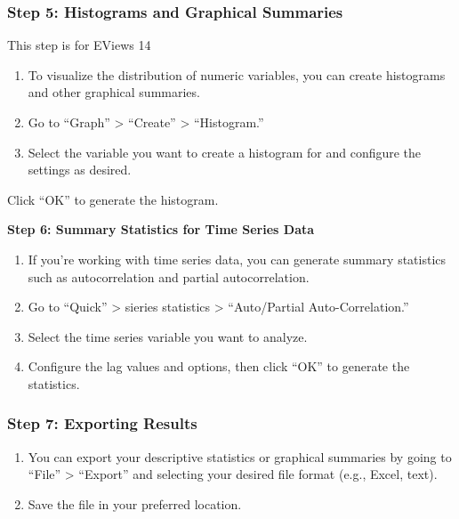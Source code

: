 \documentclass[
  letterpaper,
  DIV=11,
  numbers=noendperiod]{scrartcl}
\begin{document}
\hypertarget{step-5-histograms-and-graphical-summaries}{%
\subsubsection{\texorpdfstring{\textbf{Step 5: Histograms and Graphical
Summaries}}{Step 5: Histograms and Graphical Summaries}}\label{step-5-histograms-and-graphical-summaries}}

This step is for EViews 14

\begin{enumerate}
\def\labelenumi{\arabic{enumi}.}
\item
  To visualize the distribution of numeric variables, you can create
  histograms and other graphical summaries.
\item
  Go to ``Graph'' \textgreater{} ``Create'' \textgreater{}
  ``Histogram.''
\item
  Select the variable you want to create a histogram for and configure
  the settings as desired.
\end{enumerate}

Click ``OK'' to generate the histogram.

\textbf{Step 6: Summary Statistics for Time Series Data}

\begin{enumerate}
\def\labelenumi{\arabic{enumi}.}
\item
  If you're working with time series data, you can generate summary
  statistics such as autocorrelation and partial autocorrelation.
\item
  Go to ``Quick'' \textgreater{} sieries statistics \textgreater{}
  ``Auto/Partial Auto-Correlation.''
\item
  Select the time series variable you want to analyze.
\item
  Configure the lag values and options, then click ``OK'' to generate
  the statistics.
\end{enumerate}

\hypertarget{step-7-exporting-results}{%
\subsubsection{\texorpdfstring{\textbf{Step 7: Exporting
Results}}{Step 7: Exporting Results}}\label{step-7-exporting-results}}

\begin{enumerate}
\def\labelenumi{\arabic{enumi}.}
\item
  You can export your descriptive statistics or graphical summaries by
  going to ``File'' \textgreater{} ``Export'' and selecting your desired
  file format (e.g., Excel, text).
\item
  Save the file in your preferred location.
\end{enumerate}
\end{document}
